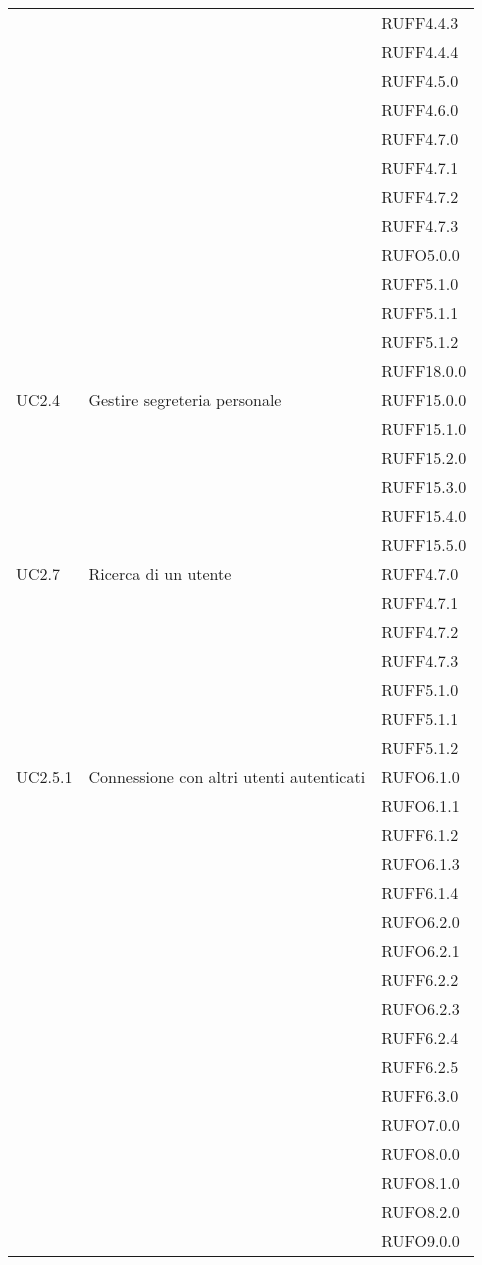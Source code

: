 \begin{center}
\begin{longtable}{lp{}l}
 &  & RUFF4.4.3 \\
 &  & RUFF4.4.4 \\
 &  & RUFF4.5.0 \\
 &  & RUFF4.6.0 \\
 &  & RUFF4.7.0 \\
 &  & RUFF4.7.1 \\
 &  & RUFF4.7.2 \\
 &  & RUFF4.7.3 \\
 &  & RUFO5.0.0 \\
 &  & RUFF5.1.0 \\
 &  & RUFF5.1.1 \\
 &  & RUFF5.1.2 \\
 &  & RUFF18.0.0 \\
UC2.4 & Gestire segreteria personale & RUFF15.0.0 \\
 &  & RUFF15.1.0 \\
 &  & RUFF15.2.0 \\
 &  & RUFF15.3.0 \\
 &  & RUFF15.4.0 \\
 &  & RUFF15.5.0 \\
UC2.7 & Ricerca di un utente & RUFF4.7.0 \\
 &  & RUFF4.7.1 \\
 &  & RUFF4.7.2 \\
 &  & RUFF4.7.3 \\
 &  & RUFF5.1.0 \\
 &  & RUFF5.1.1 \\
 &  & RUFF5.1.2 \\
UC2.5.1 & Connessione con altri utenti autenticati & RUFO6.1.0 \\
 &  & RUFO6.1.1 \\
 &  & RUFF6.1.2 \\
 &  & RUFO6.1.3 \\
 &  & RUFF6.1.4 \\
 &  & RUFO6.2.0 \\
 &  & RUFO6.2.1 \\
 &  & RUFF6.2.2 \\
 &  & RUFO6.2.3 \\
 &  & RUFF6.2.4 \\
 &  & RUFF6.2.5 \\
 &  & RUFF6.3.0 \\
 &  & RUFO7.0.0 \\
 &  & RUFO8.0.0 \\
 &  & RUFO8.1.0 \\
 &  & RUFO8.2.0 \\
 &  & RUFO9.0.0 \\

\end{longtable}
\end{center}
